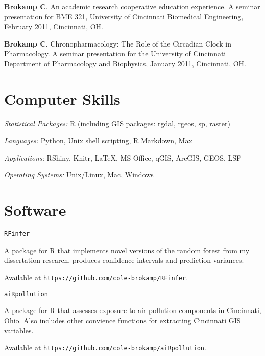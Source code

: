 \documentclass[margin,line]{res}
\newenvironment{list1}{
  \begin{list}{\ding{113}}{%
      \setlength{\itemsep}{0in}
      \setlength{\parsep}{0in} \setlength{\parskip}{0in}
      \setlength{\topsep}{0in} \setlength{\partopsep}{0in} 
      \setlength{\leftmargin}{0.17in}}}{\end{list}}
\newenvironment{list3}{
  \begin{list}{}{%
      \setlength{\itemsep}{0in}
      \setlength{\parsep}{0in} \setlength{\parskip}{0in}
      \setlength{\topsep}{0in} \setlength{\partopsep}{0in} 
      \setlength{\leftmargin}{0in}}}{\end{list}}
\begin{document}
\begin{resume}
\begin{list3}
\item[] \textbf{Brokamp C}. An academic research cooperative education experience. A seminar presentation for BME 321, University of Cincinnati Biomedical Engineering, February 2011, Cincinnati, OH.
\item[] \textbf{Brokamp C}. Chronopharmacology: The Role of the Circadian Clock in Pharmacology.  A seminar presentation for the University of Cincinnati Department of Pharmacology and Biophysics, January 2011, Cincinnati, OH.
\end{list3}



\section{\sc Computer Skills} 

\begin{list3} \itemsep 4pt
\item[] \textit{Statistical Packages:}  R (including GIS packages: rgdal, rgeos, sp, raster)
\item[] \textit{Languages:} Python, Unix shell scripting, R Markdown, Max
\item[] \textit{Applications:} RShiny, Knitr, \LaTeX, MS Office, qGIS, ArcGIS, GEOS, LSF 
\item[] \textit{Operating Systems:}  Unix/Linux, Mac, Windows\\ 
\end{list3}

\section{\sc Software}

\texttt{RFinfer}
\begin{list1} \itemsep 2pt
\item[] A package for R that implements novel versions of the random forest from my dissertation research, produces confidence intervals and prediction variances.
\item[] Available at \texttt{https://github.com/cole-brokamp/RFinfer}.
\end{list1}

\texttt{aiRpollution}
\begin{list1} \itemsep 2pt
\item[] A package for R that assesses exposure to air pollution components in Cincinnati, Ohio.  Also includes other convience functions for extracting Cincinnati GIS variables.
\item[] Available at \texttt{https://github.com/cole-brokamp/aiRpollution}.
\end{list1}


\end{resume}
\end{document}
